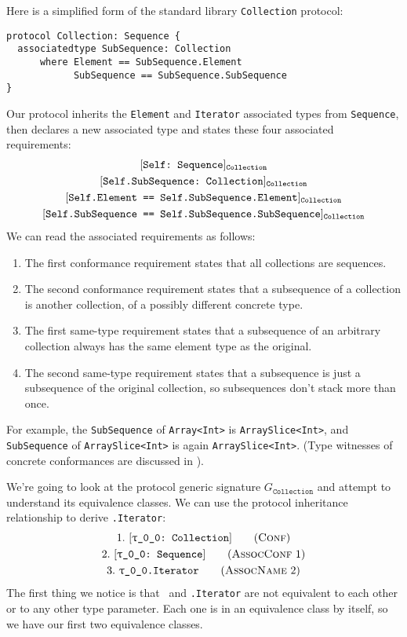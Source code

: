 \documentclass[../generics]{subfiles}
\begin{document}
\begin{example}\label{protocol collection example}
Here is a simplified form of the standard library \texttt{Collection} protocol:
\begin{Verbatim}
protocol Collection: Sequence {
  associatedtype SubSequence: Collection
      where Element == SubSequence.Element
            SubSequence == SubSequence.SubSequence
}
\end{Verbatim}
Our protocol inherits the \texttt{Element} and \texttt{Iterator} associated types from \texttt{Sequence}, then declares a new associated type and states these four associated requirements:
\begin{gather*}
\AssocConfReq{Self}{Sequence}{Collection}\\
\AssocConfReq{Self.SubSequence}{Collection}{Collection}\\
\AssocSameReq{Self.Element}{Self.SubSequence.Element}{Collection}\\
\AssocSameReq{Self.SubSequence}{Self.SubSequence.SubSequence}{Collection}
\end{gather*}
We can read the associated requirements as follows:
\begin{enumerate}
\item The first conformance requirement states that all collections are sequences.
\item The second conformance requirement states that a subsequence of a collection is another collection, of a possibly different concrete type.
\item The first same-type requirement states that a subsequence of an arbitrary collection always has the same element type as the original.
\item The second same-type requirement states that a subsequence is just a subsequence of the original collection, so subsequences don't stack more than once.
\end{enumerate}
For example, the \texttt{SubSequence} of \texttt{Array<Int>} is \texttt{ArraySlice<Int>}, and \texttt{SubSequence} of \texttt{ArraySlice<Int>} is again \texttt{ArraySlice<Int>}. (Type witnesses of concrete conformances are discussed in ).

We're going to look at the protocol generic signature $G_\texttt{Collection}$ and attempt to understand its equivalence classes. We can use the protocol inheritance relationship to derive \texttt{\rT.Iterator}:
\begin{gather*}
\ConfStep{\rT}{Collection}{1}\\
\AssocConfStep{1}{\rT}{Sequence}{2}\\
\AssocNameStep{2}{\rT.Iterator}{3}
\end{gather*}
The first thing we notice is that \rT\ and \texttt{\rT.Iterator} are not equivalent to each other or to any other type parameter. Each one is in an equivalence class by itself, so we have our first two equivalence classes.


\end{example}
\end{document}
